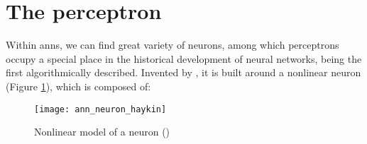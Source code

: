 

\section{The perceptron}
Within \glspl{ann}, we can find great variety of neurons, among which perceptrons occupy a special place in the historical development of neural networks, being the first algorithmically described. Invented by \cite{rosenblatt1958perceptron}, it is built around a nonlinear neuron (Figure \ref{fig:nonlinear_neuron_model}), which is composed of:

\begin{figure}[!ht]
	\centering
	\texttt{[image: ann\_neuron\_haykin]}
	\caption{Nonlinear model of a neuron (\cite{haykin2009neural})}
	\label{fig:nonlinear_neuron_model}
\end{figure}

